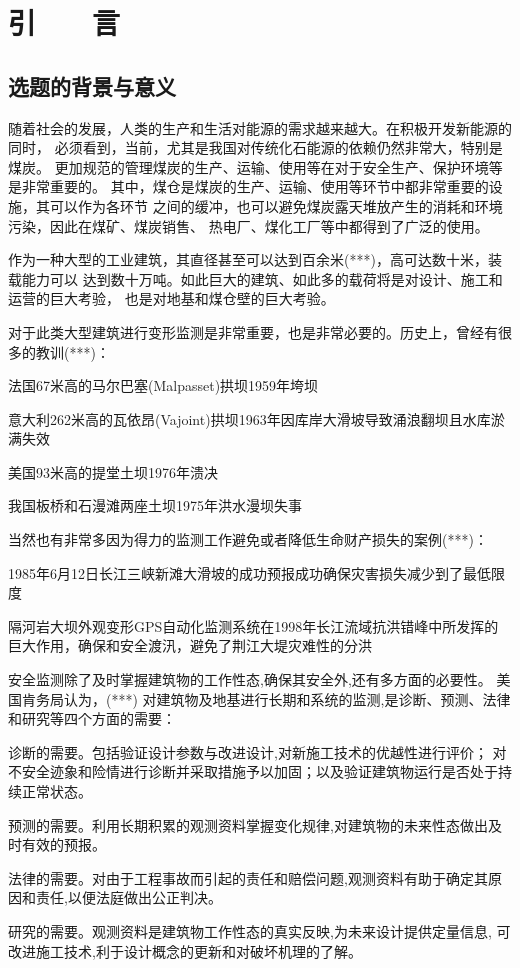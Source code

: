 
\chapter*{\hfill 引　　言 \hfill}
\label{chap00}

\section{选题的背景与意义}
随着社会的发展，人类的生产和生活对能源的需求越来越大。在积极开发新能源的同时，
必须看到，当前，尤其是我国对传统化石能源的依赖仍然非常大，特别是煤炭。
更加规范的管理煤炭的生产、运输、使用等在对于安全生产、保护环境等是非常重要的。
其中，煤仓是煤炭的生产、运输、使用等环节中都非常重要的设施，其可以作为各环节
之间的缓冲，也可以避免煤炭露天堆放产生的消耗和环境污染，因此在煤矿、煤炭销售、
热电厂、煤化工厂等中都得到了广泛的使用。

作为一种大型的工业建筑，其直径甚至可以达到百余米(***)，高可达数十米，装载能力可以
达到数十万吨。如此巨大的建筑、如此多的载荷将是对设计、施工和运营的巨大考验，
也是对地基和煤仓壁的巨大考验。

对于此类大型建筑进行变形监测是非常重要，也是非常必要的。历史上，曾经有很多的教训(***)：
\begin{asparaitem}[$\bullet$]
\item 法国67米高的马尔巴塞(Malpasset)拱坝1959年垮坝
\item 意大利262米高的瓦依昂(Vajoint)拱坝1963年因库岸大滑坡导致涌浪翻坝且水库淤满失效
\item 美国93米高的提堂土坝1976年溃决
\item 我国板桥和石漫滩两座土坝1975年洪水漫坝失事
\end{asparaitem}
当然也有非常多因为得力的监测工作避免或者降低生命财产损失的案例(***)：
\begin{asparaitem}[$\bullet$]
\item 1985年6月12日长江三峡新滩大滑坡的成功预报成功确保灾害损失减少到了最低限度
\item 隔河岩大坝外观变形GPS自动化监测系统在1998年长江流域抗洪错峰中所发挥的巨大作用，确保和安全渡汛，避免了荆江大堤灾难性的分洪
\end{asparaitem}

安全监测除了及时掌握建筑物的工作性态,确保其安全外,还有多方面的必要性。
美国肯务局认为，(***)
对建筑物及地基进行长期和系统的监测,是诊断、预测、法律和研究等四个方面的需要：
\begin{asparaitem}[$\bullet$]
\item 诊断的需要。包括验证设计参数与改进设计,对新施工技术的优越性进行评价；
对不安全迹象和险情进行诊断并采取措施予以加固；以及验证建筑物运行是否处于持续正常状态。
\item 预测的需要。利用长期积累的观测资料掌握变化规律,对建筑物的未来性态做出及时有效的预报。
\item 法律的需要。对由于工程事故而引起的责任和赔偿问题,观测资料有助于确定其原因和责任,以便法庭做出公正判决。
\item 研究的需要。观测资料是建筑物工作性态的真实反映,为未来设计提供定量信息,
可改进施工技术,利于设计概念的更新和对破坏机理的了解。
\end{asparaitem}

